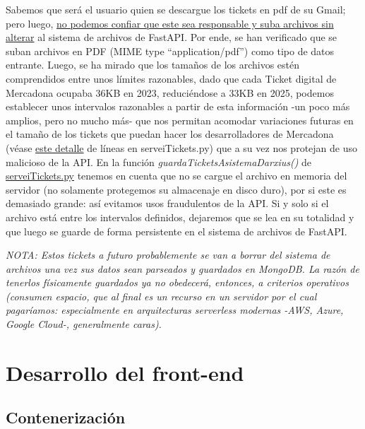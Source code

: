 \documentclass[a4paper,12pt]{report}
\begin{document}
	Sabemos que será el usuario quien se descargue los tickets en pdf de su Gmail; pero luego, \underline{no podemos confiar que este sea responsable y suba archivos sin alterar} al sistema de archivos de FastAPI. Por ende, se han verificado que se suban archivos en PDF (MIME type ``application/pdf'') como tipo de datos entrante. Luego, se ha mirado que los tamaños de los archivos estén comprendidos entre unos límites razonables, dado que cada Ticket digital de Mercadona ocupaba 36KB en 2023, reduciéndose a 33KB en 2025, podemos establecer unos intervalos razonables a partir de esta información -un poco más amplios, pero no mucho más- que nos permitan acomodar variaciones futuras en el tamaño de los tickets que puedan hacer los desarrolladores de Mercadona (véase \href{https://github.com/blackcub3s/mercApp/blob/23594665639485c1bf9b7ba7e1904fe9785cf5ae/APP%20WEB/__FastAPI__/app/serveiTickets.py#L84-L85}{este detalle} de líneas en serveiTickets.py) que a su vez nos protejan de uso malicioso de la API. En la función \textit{guardaTicketsAsistemaDarxius()} de  \href{https://github.com/blackcub3s/mercApp/blob/main/APP%20WEB/__FastAPI__/app/serveiTickets.py}{serveiTickets.py} tenemos en cuenta que no se cargue el archivo en memoria del servidor (no solamente protegemos su almacenaje en disco duro), por si este es demasiado grande: así evitamos usos fraudulentos de la API. Si y solo si el archivo está entre los intervalos definidos, dejaremos que se lea en su totalidad y que luego se guarde de forma persistente en el sistema de archivos de FastAPI.
	
\textit{NOTA: Estos tickets a futuro probablemente se van a borrar del sistema de archivos una vez sus datos sean parseados y guardados en MongoDB. La razón de tenerlos físicamente guardados ya no obedecerá, entonces, a criterios operativos (consumen espacio, que al final es un recurso en un servidor por el cual pagaríamos: especialmente en arquitecturas serverless modernas -AWS, Azure, Google Cloud-, generalmente caras).}
	
	
	
	\section{Desarrollo del front-end}
	
	\subsection{Contenerización}
	\label{sec:conteneritzacioNginx}
	
\end{document}
